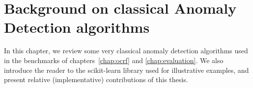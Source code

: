

\chapter{Background on classical Anomaly Detection algorithms}
\label{back:AD_scikit}
\begin{chapabstract}
  In this chapter, we review some very classical anomaly detection algorithms used in the benchmarks of chapters~\ref{chap:ocrf} and \ref{chap:evaluation}. We also introduce the reader to the scikit-learn library used for illustrative examples, and present relative (implementative) contributions of this thesis. %
\end{chapabstract}

